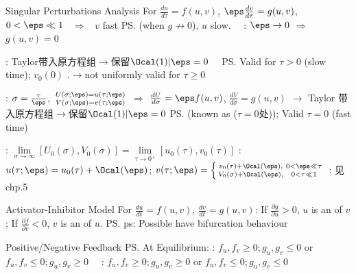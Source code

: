 \documentclass{note}
\begin{document}
\begin{MyTh}{Singular Perturbations Analysis}
    For $\frac{du}{d\tau}=f(u,v)$, $\eps\frac{dv}{d\tau}=g(u,v)$, $0<\eps\ll1$ \ $\Rightarrow$ \ $v$ fast \ps{\tiny (when $g\not\to0$)}, $u$ slow. \ \ {\scriptsize {}: $\eps\to0$ $\Rightarrow$ $g(u,v)=0$}

    \vspace{-3pt}
    {\footnotesize \quad {}} \quad {}: {\scriptsize Taylor带入原方程组$\to$保留$\Ocal(1)|\eps=0$} \ \ \ps{\tiny Valid for $\tau>0$ (slow time); $v_0(0)$ .$\to$not uniformly valid for $\tau\geq0$}
    
    \vspace{-3pt}
    {\footnotesize \quad {}: $\sigma = \frac{\tau}{\eps}$, $\begin{smallmatrix}U(\sigma;\eps)=u(\tau;\eps) \\ V(\sigma;\eps)=v(\tau;\eps)\end{smallmatrix}$ $\Rightarrow$ $\frac{dU}{d\sigma}=\eps f(u,v)$, $\frac{dV}{d\sigma}=g(u,v)$ $\to$ {\scriptsize Taylor 带入原方程组$\to$保留$\Ocal(1)|\eps=0$} \ps{\tiny (known as  ($\tau=0$处)); Valid $\tau=0$ (fast time)}}

    {\footnotesize \quad {}: {\scriptsize $\lim\limits_{\sigma\to\infty}[U_0(\sigma),V_0(\sigma)]=\lim\limits_{\tau\to0^+}[u_0(\tau),v_0(\tau)]$} \qquad {}: {\scriptsize $u(\tau;\eps)=u_0(\tau)+\Ocal(\eps)$; $v(\tau;\eps)=\left\{ \begin{smallmatrix} v_0(\tau)+\Ocal(\eps), & 0<\eps\ll \tau \\ V_0(\sigma)+\Ocal(\eps), & 0<\tau\ll 1 \end{smallmatrix}\right.$} \tiny {}: 见chp.5}
\end{MyTh}

\vspace{-3pt}
\begin{MyTh}{Activator-Inhibitor Model}
    For $\frac{du}{dt}=f(u,v)$, $\frac{dv}{dt}=g(u,v)$: If $\frac{\partial g}{\partial u}>0$, $u$ is an  of $v$; If $\frac{\partial f}{\partial v}<0$, $v$ is an  of $u$. \quad \ps{\tiny ps: Possible have bifurcation behaviour}
\end{MyTh}

\begin{MyTh}{Positive/Negative Feedback}
    \scriptsize \ps{At Equilibrium}: : $f_u,f_v\geq0;g_u,g_v\leq0$ or $f_u,f_v\leq0;g_u,g_v\geq0$ \ \ : $f_u,f_v\geq0;g_u,g_v\geq0$ or $f_u,f_v\leq0;g_u,g_v\leq0$
\end{MyTh}
\end{document}
